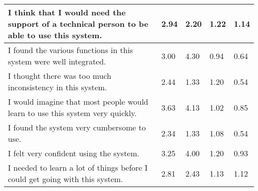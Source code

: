 \begin{table}[tb]
\begin{tabular}{@{}|m{6cm}R{1.7cm}R{1.7cm}R{1.7cm}R{1.7cm}|@{}}
    I think that I would need the support of a technical person to be able to use this system. & 2.94                                            & 2.20                                         & 1.22                                            & 1.14                                          \\ \midrule
    I found the various functions in this system were well integrated.                         & 3.00                                            & 4.30                                         & 0.94                                            & 0.64                                          \\ \midrule
    I thought there was too much inconsistency in this system.                                 & 2.44                                            & 1.33                                         & 1.20                                            & 0.54                                          \\ \midrule
    I would imagine that most people would learn to use this system very quickly.              & 3.63                                            & 4.13                                         & 1.02                                            & 0.85                                          \\ \midrule
    I found the system very cumbersome to use.                                                 & 2.34                                            & 1.33                                         & 1.08                                            & 0.54                                          \\ \midrule
    I felt very confident using the system.                                                    & 3.25                                            & 4.00                                         & 1.20                                            & 0.93                                          \\ \midrule
    I needed to learn a lot of things before I could get going with this system.               & 2.81                                            & 2.43                                         & 1.13                                            & 1.12                                          \\ \bottomrule
    \end{tabular}
    \end{table}


